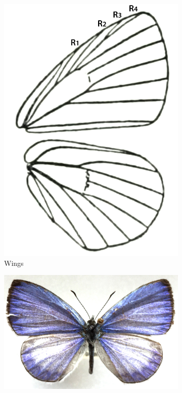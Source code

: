 \documentclass[letterpaper, 11pt]{article}
\begin{document}
\begin{figure}[ht!]
    \centering
    \begin{subfigure}[ht!]{0.27\textwidth}
        \includegraphics[width=\textwidth]{LycaenidWings}
        \caption{Wings \citep[][Fig. 136]{bhl162310}}
        \label{fig:lycaenid1}
    \end{subfigure}
    \hfill %
    \begin{subfigure}[ht!]{0.5\textwidth}
        \includegraphics[width=\textwidth]{LycaenidHabitus}

\end{subfigure}
\end{figure}
\end{document}
